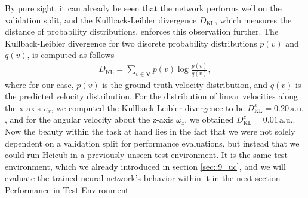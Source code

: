 By pure sight, it can already be seen that the network performs well on the validation split, and the Kullback-Leibler divergence $D_\text{KL}$, which measures the distance of probability distributions, enforces this observation further. The Kullback-Leibler divergence for two discrete probability distributions $p(v)$ and $q(v)$, is computed as follows
\begin{align}
	D_\text{KL} = \sum_{v\in \bm{V}}p(v)\log\frac{p(v)}{q(v)},
\end{align}
where for our case, $p(v)$ is the ground truth velocity distribution, and $q(v)$ is the predicted velocity distribution. For the distribution of linear velocities along the x-axis $v_x$, we computed the Kullback-Leibler divergence to be $D^x_\text{KL}=0.20\,\text{a.u.}$, and for the angular velocity about the z-axis $\omega_z$, we obtained $D^z_\text{KL}=0.01\,\text{a.u.}$. Now the beauty within the task at hand lies in the fact that we were not solely dependent on a validation split for performance evaluations, but instead that we could run Heicub in a previously unseen test environment. It is the same test environment, which we already introduced in section \ref{sec::9_uc}, and we will evaluate the trained neural network's behavior within it in the next section - Performance in Test Environment.
\FloatBarrier
